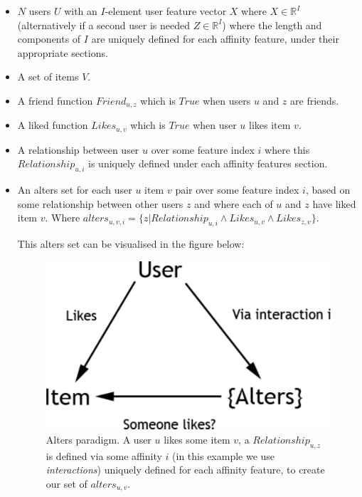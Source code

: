 \begin{itemize}
\item $N$ users $U$ with an $I$-element user feature vector $X$ where $X \in \mathbb{R}^I$ (alternatively if a second user is needed $Z \in \mathbb{R}^I$) 
where the length and components of $I$ are uniquely defined for each affinity feature, under their appropriate sections.
\item A set of items $V$.
\item A friend function $Friend_{u,z}$ which is $True$ when users $u$ and $z$ are friends.
\item A liked function $Likes_{u,v}$ which is $True$ when user $u$ likes item $v$.
\item A relationship between user $u$ over some feature index $i$ where this $Relationship_{u,i}$ is uniquely defined under each affinity features section.
\item An alters set for each user $u$ item $v$ pair over some feature index $i$, based on some relationship between other users $z$ and where each of $u$ and $z$ have liked item $v$. 
Where $alters_{u,v,i} = \{z | Relationship_{u,i} \wedge Likes_{u,v} \wedge Likes_{z,v}\}$.

\clearpage
This alters set can be visualised in the figure below:

\begin{figure}[tbh!]
	\begin{center}
		\includegraphics[scale=0.60]{imgs/alters.pdf}
		\caption{Alters paradigm. A user $u$ likes some item $v$, a $Relationship_{u,z}$ is defined via some affinity $i$ (in this example we use \emph{interactions}) uniquely defined
		for each affinity feature, to create our set of $alters_{u,v}$.}
	\end{center}
\end{figure}


\end{itemize}

